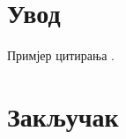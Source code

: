 \documentclass[12pt,a4paper]{scrreprt}
\title{\naziv}
\begin{document}



\tableofcontents
{}
\chapter{Увод}
Примјер цитирања \cite{book:1}.

\chapter{Закључак}


\end{document}
